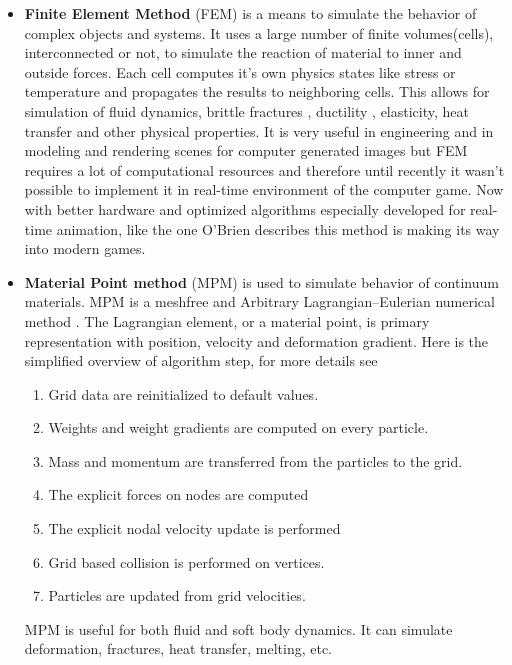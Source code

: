 \begin{itemize}

\item \textbf{Finite Element Method} (FEM) is a means to simulate the behavior of complex objects and systems.  It uses a large number of finite volumes(cells), interconnected or not, to simulate the reaction of material to inner and outside forces. Each cell computes it's own physics states like stress or temperature and propagates the results to neighboring cells. This allows for simulation of fluid dynamics, brittle fractures \cite{brittlefracture}, ductility \cite{ductilefracture}, elasticity, heat transfer and other physical properties. It is very useful in engineering and in modeling and rendering scenes for computer generated images but FEM requires a lot of computational resources and therefore until recently it wasn't possible to implement it in real-time environment of the computer game. Now with better hardware and optimized algorithms especially developed for real-time animation, like the one O'Brien \cite{femingames} describes this method is making its way into modern games.

\item \textbf{Material Point method} (MPM) is used to simulate behavior of continuum materials. MPM is a meshfree and Arbitrary Lagrangian–Eulerian numerical method \cite{ALE}. The Lagrangian element, or a material point, is  primary representation with position, velocity and deformation gradient. Here is the simplified overview of algorithm step, for more details see \cite{jiang2015material} 
\begin{enumerate}
	\item Grid data are reinitialized to default values.
    \item Weights and weight gradients are computed on every particle.
    \item Mass and momentum are transferred from the particles to the grid.
    \item The explicit forces on nodes are computed
    \item The explicit nodal velocity update is performed
    \item Grid based collision is performed on vertices.
    \item Particles are updated from grid velocities.
\end{enumerate}
MPM is useful for both fluid and soft body dynamics. It can simulate deformation, fractures, heat transfer, melting, etc.


\end{itemize}
